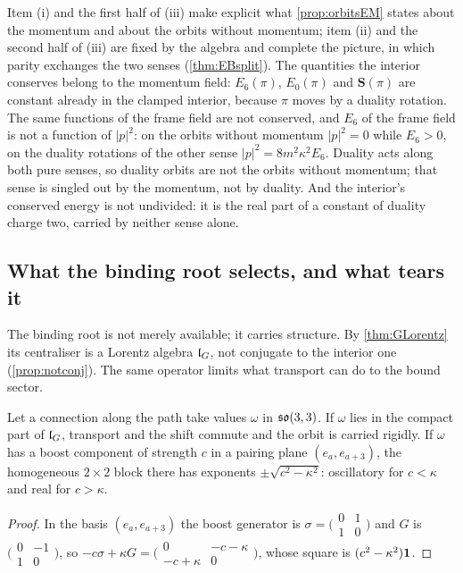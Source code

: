 Item (i) and the first half of (iii) make explicit what \cref{prop:orbitsEM} states about the momentum and about the orbits without momentum;
item (ii) and the second half of (iii) are fixed by the algebra and complete the picture, in which parity exchanges the two senses
(\cref{thm:EBsplit}). The
quantities the interior conserves belong to the momentum field: $E_6(\pi)$, $E_0(\pi)$ and $\mathbf S(\pi)$ are constant already in the clamped
interior, because $\pi$ moves by a duality rotation. The same functions of the frame field are not conserved, and $E_6$ of the frame field is not a
function of $|p|^2$: on the orbits without momentum $|p|^2=0$ while $E_6>0$, on the duality rotations of the other sense $|p|^2=8m^2\kappa^2E_6$.
Duality acts along both pure senses, so duality orbits are not the orbits without momentum; that sense is singled out by the momentum, not by
duality. And the interior's conserved energy is not undivided: it is the real part of a constant of duality charge two, carried by neither sense
alone.

\subsection{What the binding root selects, and what tears it}

The binding root is not merely available; it carries structure. By \cref{thm:GLorentz} its centraliser is a Lorentz algebra $\mathfrak l_G$, not
conjugate to the interior one (\cref{prop:notconj}). The same operator limits what transport can do to the bound sector.

\begin{proposition}
\label{prop:tear}
Let a connection along the path take values $\omega$ in $\mathfrak{so}(3,3)$. If $\omega$ lies in the compact part of $\mathfrak l_G$, transport and the shift commute
and the orbit is carried rigidly. If $\omega$ has a boost component of strength $c$ in a pairing plane $(e_a,e_{a+3})$, the homogeneous $2\times2$
block there has exponents $\pm\sqrt{c^2-\kappa^2}$: oscillatory for $c<\kappa$ and real for $c>\kappa$.
\end{proposition}

\begin{proof}
In the basis $(e_a,e_{a+3})$ the boost generator is $\sigma=\bigl(\begin{smallmatrix}0&1\\1&0\end{smallmatrix}\bigr)$ and $G$ is
$\bigl(\begin{smallmatrix}0&-1\\1&0\end{smallmatrix}\bigr)$, so $-c\sigma+\kappa G=\bigl(\begin{smallmatrix}0&-c-\kappa\\-c+\kappa&0\end{smallmatrix}\bigr)$, whose
square is $(c^2-\kappa^2)\mathbf 1$.
\end{proof}

